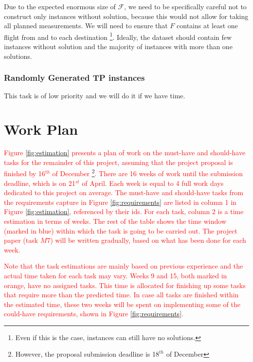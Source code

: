 \documentclass{mprop}
\theoremstyle{definition}
\begin{document}
Due to the expected enormous size of $\mathcal{F}$, we need to be specifically careful not to construct only instances without solution, because this would not allow for taking all planned measurements. We will need to ensure that $F$ contains at least one flight from and to each destination \footnote{Even if this is the case, instances can still have no solutions.}. Ideally, the dataset should contain few instances without solution and the majority of instances with more than one solutions.

\subsubsection*{Randomly Generated TP instances}

This task is of low priority and we will do it if we have time.

\section{Work Plan}
\label{sec:workplan}

\textcolor{red}{
Figure \ref{fig:estimation} presents a plan of work on the must-have and should-have tasks for the remainder of this project, assuming that the project proposal is finished by 16$^{th}$ of December \footnote{However, the proposal submission deadline is 18$^{th}$ of December}. There are 16 weeks of work until the submission deadline, which is on 21$^{st}$ of April. Each week is equal to 4 full work days dedicated to this project on average. The must-have and should-have tasks from the requirements capture in Figure \ref{fig:requirements} are listed in column 1 in Figure \ref{fig:estimation}, referenced by their ids. For each task, column 2 is a time estimation in terms of weeks. The rest of the table shows the time window (marked in blue) within which the task is going to be carried out. The project paper (task $M7$) will be written gradually, based on what has been done for each week.}

\textcolor{red}{
Note that the task estimations are mainly based on previous experience and the actual time taken for each task may vary. Weeks 9 and 15, both marked in orange, have no assigned tasks. This time is allocated for finishing up some tasks that require more than the predicted time. In case all tasks are finished within the estimated time, these two weeks will be spent on implementing some of the could-have requirements, shown in Figure \ref{fig:requirements}.}
\end{document}
